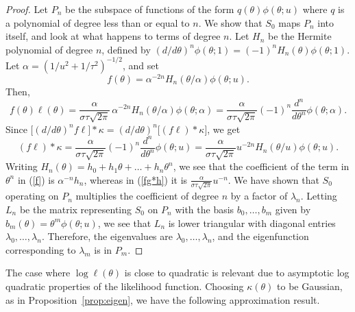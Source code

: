 \documentclass[11pt]{article}
\newcommand\mytheta{\theta}
\newcommand\lik{\ell}
\begin{document}
\begin{proof}
Let $P_n$ be the subspace of functions of the form $q(\mytheta)\phi(\mytheta;u)$ where $q$ is a polynomial of degree less than or equal to $n$. We show that $S_0$ maps $P_n$ into itself, and look at what happens to terms of degree $n$.
Let $H_n$ be the Hermite polynomial of degree $n$, defined by $(d/d\mytheta)^n \phi(\mytheta;1)= (-1)^n H_n(\mytheta) \phi(\mytheta;1)$.
Let  $\alpha = (1/u^2 + 1/\tau^2)^{-1/2}$, and set
\begin{equation}\label{f}
f(\mytheta) = \alpha^{-2n} H_n(\mytheta/\alpha)\phi(\mytheta;u).
\end{equation}
Then,
\begin{equation}
f(\theta)\lik(\theta) = \frac{\alpha}{\sigma\tau \sqrt{2\pi}}\,  \alpha^{-2n} H_n(\mytheta/\alpha)\phi(\mytheta;\alpha) = \frac{\alpha}{\sigma\tau \sqrt{2\pi}} (-1)^n \frac{d^n}{d\mytheta^n} \phi(\mytheta;\alpha).
\end{equation}
Since $\big[(d/d\mytheta)^n f\lik\big] * \kappa = (d/d\mytheta)^n\big[(f\lik)*\kappa \big]$, we get
\begin{equation}\label{fg*h}
(f\lik)*\kappa = \frac{\alpha}{\sigma\tau \sqrt{2\pi}} (-1)^n \frac{d^n}{d\mytheta^n} \phi(\mytheta;u) = \frac{\alpha}{\sigma\tau \sqrt{2\pi}}
u^{-2n}H_n(\mytheta/u)\phi(\mytheta;u).
\end{equation}
Writing $H_n(\mytheta)=h_0+h_1\mytheta+\dots+h_n\mytheta^n$, we see that the coefficient of the term in $\mytheta^n$ in (\ref{f}) is $\alpha^{-n}h_n
$, whereas in (\ref{fg*h}) it is $\frac{\alpha}{\sigma\tau \sqrt{2\pi}}u^{-n}$.
We have shown that $S_0$ operating on $P_n$ multiplies the coefficient of degree $n$ by a factor of $\lambda_n$.
Letting $L_n$ be the matrix representing $S_0$ on $P_n$ with the basis $b_0,\dots,b_m$ given by 
$b_m(\mytheta)=\mytheta^m\phi(\mytheta;u)$, we see that $L_n$ is lower triangular with diagonal entries $\lambda_0,\dots,\lambda_n$.
Therefore, the eigenvalues are $\lambda_0,\dots,\lambda_n$, and the eigenfunction corresponding to $\lambda_m$ is in $P_m$.
\end{proof}
The case where $\log\lik(\theta)$ is close to quadratic is relevant due to asymptotic log quadratic properties of the likelihood function.
Choosing $\kappa(\theta)$ to be Gaussian, as in Proposition~\ref{prop:eigen}, we have the following approximation result. 
\end{document}
